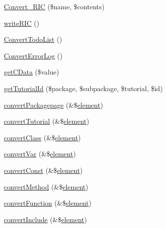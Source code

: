 \begin{DoxyCompactItemize}
\item 
\hyperlink{class_h_t_m_l_smarty_converter_ad3f7aa571c77bab78c11f387be1ec587}{\-Convert\-\_\-\-R\-I\-C} (\$name, \$contents)
\item 
\hyperlink{class_h_t_m_l_smarty_converter_a1d6cfee3cc9cd6d6cdc2b421d08fc74e}{write\-R\-I\-C} ()
\item 
\hyperlink{class_h_t_m_l_smarty_converter_a756b83c7febf175624cf1d2562bf02ae}{\-Convert\-Todo\-List} ()
\item 
\hyperlink{class_h_t_m_l_smarty_converter_a5a02e88d6dba03b66f46fd411e5ac2c2}{\-Convert\-Error\-Log} ()
\item 
\hyperlink{class_h_t_m_l_smarty_converter_a37fe6f6ddd1cd15d360788064dce7a43}{get\-C\-Data} (\$value)
\item 
\hyperlink{class_h_t_m_l_smarty_converter_a98de4e6484c42e491de454411f606871}{get\-Tutorial\-Id} (\$package, \$subpackage, \$tutorial, \$id)
\item 
\hyperlink{class_h_t_m_l_smarty_converter_ab5f3dde79110c1809860e42205e9b787}{convert\-Packagepage} (\&\$\hyperlink{bug-904820_8php_aa94081298ab2dfd0f261cce6c203d9aa}{element})
\item 
\hyperlink{class_h_t_m_l_smarty_converter_a129673c76d85dfee7bd2170d59b33fba}{convert\-Tutorial} (\&\$\hyperlink{bug-904820_8php_aa94081298ab2dfd0f261cce6c203d9aa}{element})
\item 
\hyperlink{class_h_t_m_l_smarty_converter_afec21ed9dd3b8ac7495c4d6d5741d7af}{convert\-Class} (\&\$\hyperlink{bug-904820_8php_aa94081298ab2dfd0f261cce6c203d9aa}{element})
\item 
\hyperlink{class_h_t_m_l_smarty_converter_ac5907fa8ea3429f4823e8f937b5a98c1}{convert\-Var} (\&\$\hyperlink{bug-904820_8php_aa94081298ab2dfd0f261cce6c203d9aa}{element})
\item 
\hyperlink{class_h_t_m_l_smarty_converter_a87097a10d0995a404c71a0b22e2c6b7d}{convert\-Const} (\&\$\hyperlink{bug-904820_8php_aa94081298ab2dfd0f261cce6c203d9aa}{element})
\item 
\hyperlink{class_h_t_m_l_smarty_converter_ad2593363c9de7c36ee6f4f7de17ba94d}{convert\-Method} (\&\$\hyperlink{bug-904820_8php_aa94081298ab2dfd0f261cce6c203d9aa}{element})
\item 
\hyperlink{class_h_t_m_l_smarty_converter_acd30d12b8e21ce245f1b9dbbf8bf29b0}{convert\-Function} (\&\$\hyperlink{bug-904820_8php_aa94081298ab2dfd0f261cce6c203d9aa}{element})
\item 
\hyperlink{class_h_t_m_l_smarty_converter_a548baade863d365286d46ca66564711f}{convert\-Include} (\&\$\hyperlink{bug-904820_8php_aa94081298ab2dfd0f261cce6c203d9aa}{element})

\end{DoxyCompactItemize}
